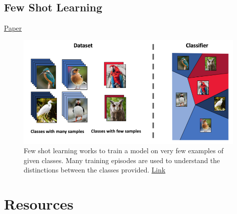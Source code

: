 \documentclass{article}
\begin{document}
\newpage
\subsection{Few Shot Learning}
\href{https://openreview.net/forum?id=HkxLXnAcFQ}{Paper}
\begin{figure}[H]
    \centering
    \includegraphics[width=4.5in]{fewshot.png}
    \caption{Few shot learning works to train a model on very few examples of given classes. Many training episodes are used to understand the distinctions between the classes provided.  \href{https://medium.com/sap-machine-learning-research/deep-few-shot-learning-a1caa289f18}{Link}}
    \label{fig:fewshot}
\end{figure}

\newpage
\section{Resources}
\end{document}
